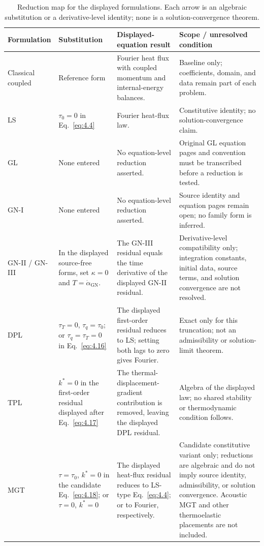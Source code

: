 \begin{table}[htbp]
\centering
\scriptsize
\caption{Reduction map for the displayed formulations. Each arrow is an algebraic substitution or a derivative-level identity; none is a solution-convergence theorem.}
\label{tab:q1-reduction-map}
\setlength{\tabcolsep}{3pt}
\renewcommand{\arraystretch}{1.12}
\begin{tabularx}{\textwidth}{@{}p{2.0cm}p{3.2cm}X p{4.0cm}@{}}
\toprule
\textbf{Formulation} & \textbf{Substitution} & \textbf{Displayed-equation result} & \textbf{Scope / unresolved condition} \\
\midrule
Classical coupled & Reference form & Fourier heat flux with coupled momentum and internal-energy balances. & Baseline only; coefficients, domain, and data remain part of each problem. \\
LS & $\tau_0=0$ in Eq.~\eqref{eq:4.4} & Fourier heat-flux law. & Constitutive identity; no solution-convergence claim. \\
GL & None entered & No equation-level reduction asserted. & Original GL equation pages and convention must be transcribed before a reduction is tested. \\
GN-I & None entered & No equation-level reduction asserted. & Source identity and equation pages remain open; no family form is inferred. \\
GN-II / GN-III & In the displayed source-free forms, set $\kappa=0$ and $T=\dot\alpha_{\mathrm{GN}}$. & The GN-III residual equals the time derivative of the displayed GN-II residual. & Derivative-level compatibility only; integration constants, initial data, source terms, and solution convergence are not resolved. \\
DPL & $\tau_T=0$, $\tau_q=\tau_0$; or $\tau_q=\tau_T=0$ in Eq.~\eqref{eq:4.16} & The displayed first-order residual reduces to LS; setting both lags to zero gives Fourier. & Exact only for this truncation; not an admissibility or solution-limit theorem. \\
TPL & $k^*=0$ in the first-order residual displayed after Eq.~\eqref{eq:4.17} & The thermal-displacement-gradient contribution is removed, leaving the displayed DPL residual. & Algebra of the displayed law; no shared stability or thermodynamic condition follows. \\
MGT & $\tau=\tau_0$, $k^*=0$ in the candidate Eq.~\eqref{eq:4.18}; or $\tau=0$, $k^*=0$ & The displayed heat-flux residual reduces to LS-type Eq.~\eqref{eq:4.4}; or to Fourier, respectively. & Candidate constitutive variant only; reductions are algebraic and do not imply source identity, admissibility, or solution convergence. Acoustic MGT and other thermoelastic placements are not included. \\

\end{tabularx}
\end{table}
